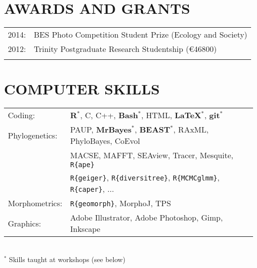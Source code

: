 \documentclass[10pt,a4paper]{article}
\begin{document}
{%


\section{AWARDS AND GRANTS}
\begin{tabular}{ll}
2014: & BES Photo Competition Student Prize (Ecology and Society)\\
2012: & Trinity Postgraduate Research Studentship (\euro46800)\\
& \\ 
\end{tabular}
\bigskip

\section{COMPUTER SKILLS}
\begin{tabular}{ll}
Coding: & \textbf{{R}$^{*}$}, C, C++, \textbf{Bash$^{*}$}, HTML, \textbf{\LaTeX$^{*}$}, \textbf{git$^{*}$}\\[1.5ex]
Phylogenetics: & PAUP, \textbf{MrBayes$^{*}$}, \textbf{BEAST$^{*}$}, RAxML, PhyloBayes, CoEvol \\
& MACSE, MAFFT, SEAview, Tracer, Mesquite, \texttt{R\{ape\}} \\
& \texttt{R\{geiger\}}, \texttt{R\{diversitree\}}, \texttt{R\{MCMCglmm\}}, \texttt{R\{caper\}}, ... \\[1.5ex]
Morphometrics: & \texttt{R\{geomorph\}}, MorphoJ, TPS \\[1.5ex]
Graphics: & Adobe Illustrator, Adobe Photoshop, Gimp, Inkscape\\[1.5ex]
\end{tabular} \\
$^{*}$ Skills taught at workshops (see below)
\bigskip

}
\end{document}
